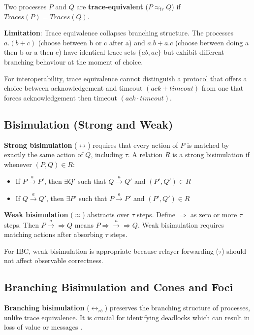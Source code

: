 Two processes \(P\) and \(Q\) are \textbf{trace-equivalent}
(\(P \approx_{tr} Q\)) if \(Traces(P) = Traces(Q)\).

\textbf{Limitation}: Trace equivalence collapses branching structure.
The processes \(a.(b + c)\) (choose between b or c after a) and
\(a.b + a.c\) (choose between doing a then b or a then c) have identical
trace sets \(\{ab, ac\}\) but exhibit different branching behaviour at
the moment of choice.

For interoperability, trace equivalence cannot distinguish a protocol
that offers a choice between acknowledgement and timeout
\((ack + timeout)\) from one that forces acknowledgement then timeout
\((ack \cdot timeout)\).

\subsection{Bisimulation (Strong and
Weak)}\label{bisimulation-strong-and-weak}

\textbf{Strong bisimulation} (\(\leftrightarrow\)) requires that every
action of \(P\) is matched by exactly the same action of \(Q\),
including \(\tau\). A relation \(R\) is a strong bisimulation if
whenever \((P,Q) \in R\):

\begin{itemize}
    \item If \(P \xrightarrow{a} P'\), then \(\exists Q'\) such that \(Q \xrightarrow{a} Q'\) and \((P',Q') \in R\)
    \item If \(Q \xrightarrow{a} Q'\), then \(\exists P'\) such that \(P \xrightarrow{a} P'\) and \((P',Q') \in R\)
\end{itemize}

\textbf{Weak bisimulation} (\(\approx\)) abstracts over \(\tau\) steps.
Define \(\Rightarrow\) as zero or more \(\tau\) steps. Then
\(P \xrightarrow{a} \Rightarrow Q\) means
\(P \Rightarrow \xrightarrow{a} \Rightarrow Q\). Weak bisimulation
requires matching actions after absorbing \(\tau\) steps.

For IBC, weak bisimulation is appropriate because relayer forwarding
(\(\tau\)) should not affect observable correctness.

\subsection{Branching Bisimulation and Cones and
Foci}\label{branching-bisimulation-and-cones-and-foci}

\textbf{Branching bisimulation} (\(\leftrightarrow_{rb}\)) preserves the
branching structure of processes, unlike trace equivalence. It is
crucial for identifying deadlocks which can result in loss of value or
messages \cite{Fokkink2004}.

